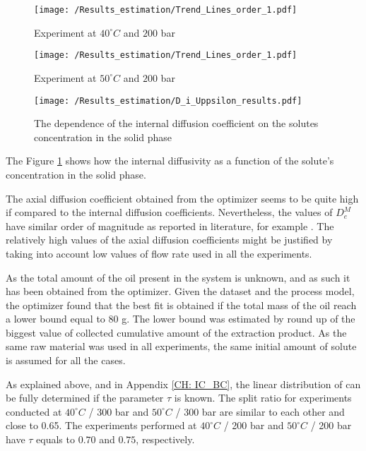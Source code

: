 \documentclass[../Article_Model_Parameters.tex]{subfiles}
\begin{document}
		\begin{figure*}[!h]
		\centering
		\begin{subfigure}[b]{0.32\textwidth}
			\centering
			\texttt{[image: /Results\_estimation/Trend\_Lines\_order\_1.pdf]}
			\caption{Experiment at $40^\circ C$ and $200$ bar}
		\end{subfigure}
		\begin{subfigure}[b]{0.32\textwidth}
			\centering
			\texttt{[image: /Results\_estimation/Trend\_Lines\_order\_1.pdf]}
			\caption{Experiment at $50^\circ C$ and $200$ bar}
		\end{subfigure}
		\hfill
		\begin{subfigure}[b]{0.32\textwidth}
			\texttt{[image: /Results\_estimation/D\_i\_Uppsilon\_results.pdf]}
			\caption{The dependence of the internal diffusion coefficient on the solutes concentration in the solid phase}
			\label{fig:Di_upsilon_res}
		\end{subfigure}
		\caption{Results of parameter estimation}
	\end{figure*}
	
	
	
	The Figure \ref{fig:Di_upsilon_res} shows how the internal diffusivity as a function of the solute's concentration in the solid phase. 
	
	The axial diffusion coefficient obtained from the optimizer seems to be quite high if compared to the internal diffusion coefficients. Nevertheless, the values of $D_e^M$ have similar order of magnitude as reported in literature, for example \citet{ReisVasco2000}. The relatively high values of the axial diffusion coefficients might be justified by taking into account low values of flow rate used in all the experiments.
	
	As the total amount of the oil present in the system is unknown, and as such it has been obtained from the optimizer. Given the dataset and the process model, the optimizer found that the best fit is obtained if the total mass of the oil reach a lower bound equal to 80 g. The lower bound was estimated by round up of the biggest value of collected cumulative amount of the extraction product. As the same raw material was used in all experiments, the same initial amount of solute is assumed for all the cases.
	
	As explained above, and in Appendix \ref{CH: IC_BC}, the linear distribution of can be fully determined if the parameter $\tau$ is known. The split ratio for experiments conducted at $40 ^\circ C$ / 300 bar and $50 ^\circ C$ / 300 bar are similar to each other and close to 0.65. The experiments performed at $40 ^\circ C$ / 200 bar and $50 ^\circ C$ / 200 bar have $\tau$ equals to $0.70$ and $0.75$, respectively. 
	
\end{document}
